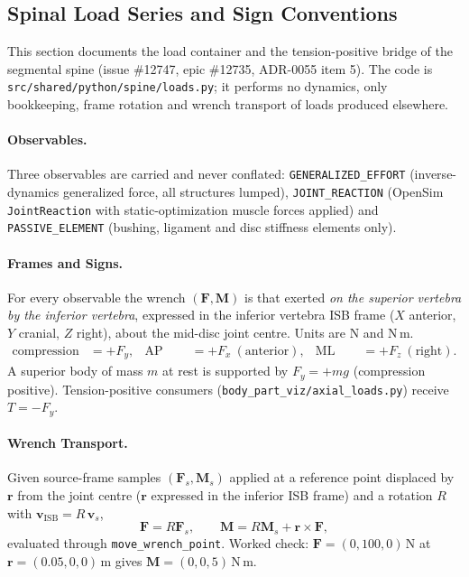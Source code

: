 \subsection{Spinal Load Series and Sign Conventions}
\label{sec:spn-5}

This section documents the load container and the tension-positive bridge of
the segmental spine (issue \#12747, epic \#12735, ADR-0055 item 5). The code is
\texttt{src/shared/python/spine/loads.py}; it performs no dynamics, only
bookkeeping, frame rotation and wrench transport of loads produced elsewhere.

\paragraph{Observables.}
Three observables are carried and never conflated: \texttt{GENERALIZED\_EFFORT}
(inverse-dynamics generalized force, all structures lumped),
\texttt{JOINT\_REACTION} (OpenSim \texttt{JointReaction} with static-optimization
muscle forces applied) and \texttt{PASSIVE\_ELEMENT} (bushing, ligament and disc
stiffness elements only).

\paragraph{Frames and Signs.}
For every observable the wrench $(\mathbf F,\mathbf M)$ is that exerted
\emph{on the superior vertebra by the inferior vertebra}, expressed in the
inferior vertebra ISB frame ($X$ anterior, $Y$ cranial, $Z$ right), about the
mid-disc joint centre. Units are N and N\,m.
\begin{align}
  \text{compression} &= +F_y, &
  \text{AP shear} &= +F_x\ (\text{anterior}), &
  \text{ML shear} &= +F_z\ (\text{right}).
\end{align}
A superior body of mass $m$ at rest is supported by $F_y=+mg$ (compression
positive). Tension-positive consumers
(\texttt{body\_part\_viz/axial\_loads.py}) receive
$T=-F_y$.

\paragraph{Wrench Transport.}
Given source-frame samples $(\mathbf F_s,\mathbf M_s)$ applied at a reference
point displaced by $\mathbf r$ from the joint centre ($\mathbf r$ expressed in
the inferior ISB frame) and a rotation $R$ with $\mathbf v_{\mathrm{ISB}}=R\,\mathbf v_s$,
\begin{equation}
  \mathbf F = R\mathbf F_s,\qquad
  \mathbf M = R\mathbf M_s + \mathbf r\times\mathbf F ,
\end{equation}
evaluated through \texttt{move\_wrench\_point}. Worked check: $\mathbf F=(0,100,0)$\,N
at $\mathbf r=(0.05,0,0)$\,m gives $\mathbf M=(0,0,5)$\,N\,m.

